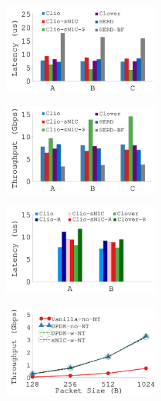 {
\begin{figure}[th]
\begin{center}
\centerline{\includegraphics[width=0.5\textwidth]{snic/Figures/g_plot_ycsb.pdf}}
{
}
\end{center}
\end{figure}
}
{
\begin{figure}[h]
\begin{center}
\centerline{\includegraphics[width=0.5\textwidth]{snic/Figures/g_plot_ycsb_throughput.pdf}}
{
}
\end{center}
\end{figure}
}
{
\begin{figure}[h]
\begin{center}
\centerline{\includegraphics[width=0.5\textwidth]{snic/Figures/g_plot_ycsb_replication.pdf}}
{
}
\end{center}
\end{figure}
}
{
\begin{figure}[h]
\begin{center}
\centerline{\includegraphics[width=0.5\textwidth]{snic/Figures/g_plot_ovs.pdf}}
{
}
\end{center}
\end{figure}
}
